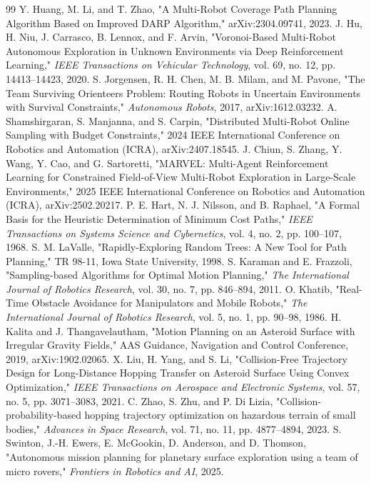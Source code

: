 \documentclass[conference]{IEEEtran}
\begin{document}
\begin{thebibliography}{99}
 Y. Huang, M. Li, and T. Zhao, "A Multi-Robot Coverage Path Planning Algorithm Based on Improved DARP Algorithm," arXiv:2304.09741, 2023.
 J. Hu, H. Niu, J. Carrasco, B. Lennox, and F. Arvin, "Voronoi-Based Multi-Robot Autonomous Exploration in Unknown Environments via Deep Reinforcement Learning," \emph{IEEE Transactions on Vehicular Technology}, vol. 69, no. 12, pp. 14413--14423, 2020.
 S. Jorgensen, R. H. Chen, M. B. Milam, and M. Pavone, "The Team Surviving Orienteers Problem: Routing Robots in Uncertain Environments with Survival Constraints," \emph{Autonomous Robots}, 2017, arXiv:1612.03232.
 A. Shamshirgaran, S. Manjanna, and S. Carpin, "Distributed Multi-Robot Online Sampling with Budget Constraints," 2024 IEEE International Conference on Robotics and Automation (ICRA), arXiv:2407.18545.
 J. Chiun, S. Zhang, Y. Wang, Y. Cao, and G. Sartoretti, "MARVEL: Multi-Agent Reinforcement Learning for Constrained Field-of-View Multi-Robot Exploration in Large-Scale Environments," 2025 IEEE International Conference on Robotics and Automation (ICRA), arXiv:2502.20217.
 P. E. Hart, N. J. Nilsson, and B. Raphael, "A Formal Basis for the Heuristic Determination of Minimum Cost Paths," \emph{IEEE Transactions on Systems Science and Cybernetics}, vol. 4, no. 2, pp. 100--107, 1968.
 S. M. LaValle, "Rapidly-Exploring Random Trees: A New Tool for Path Planning," TR 98-11, Iowa State University, 1998.
 S. Karaman and E. Frazzoli, "Sampling-based Algorithms for Optimal Motion Planning," \emph{The International Journal of Robotics Research}, vol. 30, no. 7, pp. 846--894, 2011.
 O. Khatib, "Real-Time Obstacle Avoidance for Manipulators and Mobile Robots," \emph{The International Journal of Robotics Research}, vol. 5, no. 1, pp. 90--98, 1986.
 H. Kalita and J. Thangavelautham, "Motion Planning on an Asteroid Surface with Irregular Gravity Fields," AAS Guidance, Navigation and Control Conference, 2019, arXiv:1902.02065.
 X. Liu, H. Yang, and S. Li, "Collision-Free Trajectory Design for Long-Distance Hopping Transfer on Asteroid Surface Using Convex Optimization," \emph{IEEE Transactions on Aerospace and Electronic Systems}, vol. 57, no. 5, pp. 3071--3083, 2021.
 C. Zhao, S. Zhu, and P. Di Lizia, "Collision-probability-based hopping trajectory optimization on hazardous terrain of small bodies," \emph{Advances in Space Research}, vol. 71, no. 11, pp. 4877--4894, 2023.
 S. Swinton, J.-H. Ewers, E. McGookin, D. Anderson, and D. Thomson, "Autonomous mission planning for planetary surface exploration using a team of micro rovers," \emph{Frontiers in Robotics and AI}, 2025.

\end{thebibliography}
\end{document}
